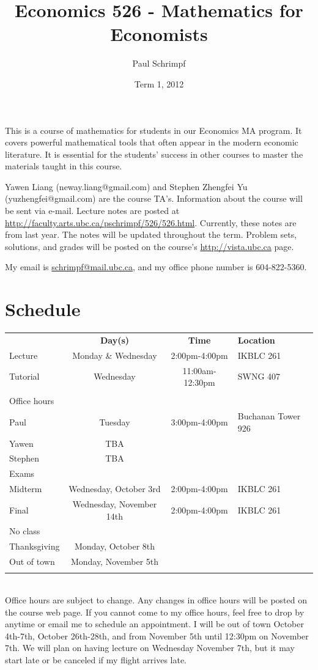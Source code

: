\documentclass[10pt]{article}
\title{Economics 526 - Mathematics for Economists}
\date{Term 1, 2012}
\author{Paul Schrimpf}
\begin{document}
\maketitle

This is a course of mathematics for students in our Economics MA
program. It covers powerful mathematical tools that often appear
in the modern economic literature. It is essential for the students'
success in other courses to master the materials taught in this
course.

Yawen Liang (neway.liang@gmail.com) and Stephen Zhengfei Yu
(yuzhengfei@gmail.com) are the course TA's.  Information about the
course will be sent via e-mail.  Lecture notes are posted at
\url{http://faculty.arts.ubc.ca/pschrimpf/526/526.html}. Currently,
these notes are from last year. The notes will be updated throughout
the term. Problem sets, solutions, and grades will be posted on the
course's \url{http://vista.ubc.ca} page.

 My email is
\href{mailto:schrimp@mail.ubc.ca}{schrimpf@mail.ubc.ca}, and my office
phone number is 604-822-5360.

\section{Schedule}
\begin{tabular}{l c c l}
  \hline 
  & \textbf{Day(s)} & \textbf{Time} & \textbf{Location} \\
  Lecture & Monday \& Wednesday & 2:00pm-4:00pm & IKBLC 261  
  \\
  Tutorial & Wednesday & 11:00am-12:30pm & SWNG 407 \\  
  \\
  Office hours \\
  \; Paul & Tuesday & 3:00pm-4:00pm & Buchanan Tower 926 \\
  \; Yawen & TBA & & \\ 
  \; Stephen & TBA & & \\ \hline
  Exams \\
  \; Midterm & Wednesday, October 3rd & 2:00pm-4:00pm & IKBLC 261 \\
  \; Final & Wednesday, November 14th & 2:00pm-4:00pm & IKBLC 261 \\
  No class \\
  \; Thanksgiving & Monday, October 8th \\
  \; Out of town & Monday, November 5th \\  
  \\ \hline 
\end{tabular} \\
Office hours are subject to change. Any changes in office hours will
be posted on the course web page. If you cannot come to my office
hours, feel free to drop by anytime or email me to schedule an
appointment.  I will be out of town October 4th-7th, October
26th-28th, and from November 5th until 12:30pm on November 7th. We will
plan on having lecture on Wednesday November 7th, but it may start
late or be canceled if my flight arrives late. 
\end{document}
